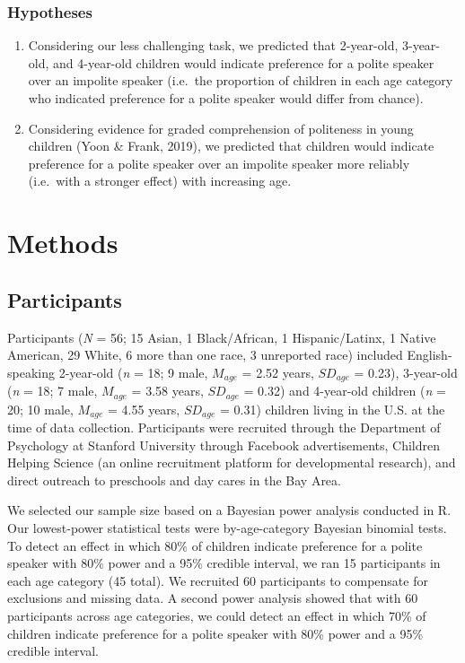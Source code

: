 \documentclass[
  english,
  man,floatsintext]{apa6}
\begin{document}
\hypertarget{hypotheses}{%
\subsubsection{Hypotheses}\label{hypotheses}}

\begin{enumerate}
\def\labelenumi{\arabic{enumi}.}
\item
  Considering our less challenging task, we predicted that 2-year-old, 3-year-old, and 4-year-old children would indicate preference for a polite speaker over an impolite speaker (i.e.~the proportion of children in each age category who indicated preference for a polite speaker would differ from chance).
\item
  Considering evidence for graded comprehension of politeness in young children (Yoon \& Frank, 2019), we predicted that children would indicate preference for a polite speaker over an impolite speaker more reliably (i.e.~with a stronger effect) with increasing age.
\end{enumerate}

\hypertarget{methods}{%
\section{Methods}\label{methods}}

\hypertarget{participants}{%
\subsection{Participants}\label{participants}}

Participants (\emph{N} = 56; 15 Asian, 1 Black/African, 1 Hispanic/Latinx, 1 Native American, 29 White, 6 more than one race, 3 unreported race) included English-speaking 2-year-old (\emph{n} = 18; 9 male, \(M_{age}\) = 2.52 years, \(SD_{age}\) = 0.23), 3-year-old (\emph{n} = 18; 7 male, \(M_{age}\) = 3.58 years, \(SD_{age}\) = 0.32) and 4-year-old children (\emph{n} = 20; 10 male, \(M_{age}\) = 4.55 years, \(SD_{age}\) = 0.31) children living in the U.S. at the time of data collection. Participants were recruited through the Department of Psychology at Stanford University through Facebook advertisements, Children Helping Science (an online recruitment platform for developmental research), and direct outreach to preschools and day cares in the Bay Area.

We selected our sample size based on a Bayesian power analysis conducted in R. Our lowest-power statistical tests were by-age-category Bayesian binomial tests. To detect an effect in which 80\% of children indicate preference for a polite speaker with 80\% power and a 95\% credible interval, we ran 15 participants in each age category (45 total). We recruited 60 participants to compensate for exclusions and missing data. A second power analysis showed that with 60 participants across age categories, we could detect an effect in which 70\% of children indicate preference for a polite speaker with 80\% power and a 95\% credible interval.
\end{document}
